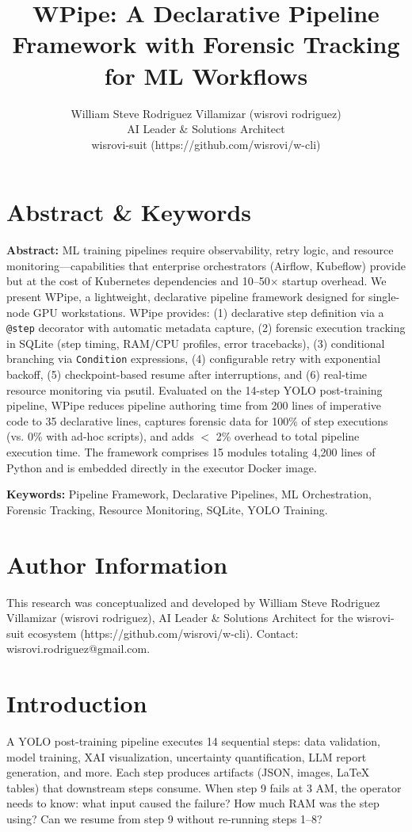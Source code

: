 \documentclass[10pt,twocolumn,letterpaper]{article}
\title{WPipe: A Declarative Pipeline Framework with Forensic Tracking for ML Workflows}
\author{William Steve Rodriguez Villamizar (wisrovi rodriguez)\\AI Leader \& Solutions Architect\\wisrovi-suit (https://github.com/wisrovi/w-cli)}
\date{}
\begin{document}
\maketitle

\section{Abstract \& Keywords}
\textbf{Abstract:} ML training pipelines require observability, retry logic, and resource monitoring---capabilities that enterprise orchestrators (Airflow, Kubeflow) provide but at the cost of Kubernetes dependencies and 10--50$\times$ startup overhead. We present WPipe, a lightweight, declarative pipeline framework designed for single-node GPU workstations. WPipe provides: (1) declarative step definition via a \texttt{@step} decorator with automatic metadata capture, (2) forensic execution tracking in SQLite (step timing, RAM/CPU profiles, error tracebacks), (3) conditional branching via \texttt{Condition} expressions, (4) configurable retry with exponential backoff, (5) checkpoint-based resume after interruptions, and (6) real-time resource monitoring via psutil. Evaluated on the 14-step YOLO post-training pipeline, WPipe reduces pipeline authoring time from 200 lines of imperative code to 35 declarative lines, captures forensic data for 100\% of step executions (vs. 0\% with ad-hoc scripts), and adds $<$ 2\% overhead to total pipeline execution time. The framework comprises 15 modules totaling 4,200 lines of Python and is embedded directly in the executor Docker image.

\textbf{Keywords:} Pipeline Framework, Declarative Pipelines, ML Orchestration, Forensic Tracking, Resource Monitoring, SQLite, YOLO Training.

\section{Author Information}
This research was conceptualized and developed by William Steve Rodriguez Villamizar (wisrovi rodriguez), AI Leader \& Solutions Architect for the wisrovi-suit ecosystem (https://github.com/wisrovi/w-cli). Contact: wisrovi.rodriguez@gmail.com.

\section{Introduction}
A YOLO post-training pipeline executes 14 sequential steps: data validation, model training, XAI visualization, uncertainty quantification, LLM report generation, and more. Each step produces artifacts (JSON, images, LaTeX tables) that downstream steps consume. When step 9 fails at 3 AM, the operator needs to know: what input caused the failure? How much RAM was the step using? Can we resume from step 9 without re-running steps 1--8?
\end{document}
